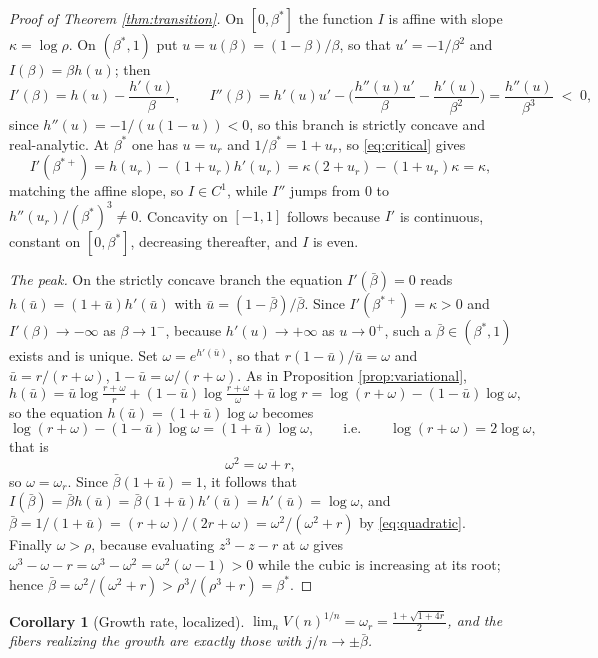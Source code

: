 \documentclass[11pt]{amsart}
\newtheorem{corollary}[theorem]{Corollary}
\theoremstyle{definition}
\theoremstyle{remark}
\begin{document}
\begin{proof}[Proof of Theorem \ref{thm:transition}]
On $[0,\beta^{*}]$ the function $I$ is affine with slope $\kappa=\log\rho$. On $(\beta^{*},1)$ put $u=u(\beta)=(1-\beta)/\beta$, so that $u'=-1/\beta^{2}$ and $I(\beta)=\beta h(u)$; then
\[
I'(\beta)=h(u)-\frac{h'(u)}{\beta},
\qquad
I''(\beta)=h'(u)u'-\Big(\frac{h''(u)u'}{\beta}-\frac{h'(u)}{\beta^{2}}\Big)
=\frac{h''(u)}{\beta^{3}}\;<\;0 ,
\]
since $h''(u)=-1/(u(1-u))<0$, so this branch is strictly concave and real-analytic. At $\beta^{*}$ one has $u=u_r$ and $1/\beta^{*}=1+u_r$, so \eqref{eq:critical} gives
\[
I'(\beta^{*+})=h(u_r)-(1+u_r)h'(u_r)=\kappa(2+u_r)-(1+u_r)\kappa=\kappa ,
\]
matching the affine slope, so $I\in C^{1}$, while $I''$ jumps from $0$ to $h''(u_r)/(\beta^{*})^{3}\neq0$. Concavity on $[-1,1]$ follows because $I'$ is continuous, constant on $[0,\beta^{*}]$, decreasing thereafter, and $I$ is even.

\emph{The peak.} On the strictly concave branch the equation $I'(\bar\beta)=0$ reads $h(\bar u)=(1+\bar u)h'(\bar u)$ with $\bar u=(1-\bar\beta)/\bar\beta$. Since $I'(\beta^{*+})=\kappa>0$ and $I'(\beta)\to-\infty$ as $\beta\to1^{-}$, because $h'(u)\to+\infty$ as $u\to0^{+}$, such a $\bar\beta\in(\beta^{*},1)$ exists and is unique. Set $\omega=e^{h'(\bar u)}$, so that $r(1-\bar u)/\bar u=\omega$ and $\bar u=r/(r+\omega)$, $1-\bar u=\omega/(r+\omega)$. As in Proposition \ref{prop:variational},
\[
h(\bar u)=\bar u\log\tfrac{r+\omega}{r}+(1-\bar u)\log\tfrac{r+\omega}{\omega}+\bar u\log r=\log(r+\omega)-(1-\bar u)\log\omega ,
\]
so the equation $h(\bar u)=(1+\bar u)\log\omega$ becomes
\[
\log(r+\omega)-(1-\bar u)\log\omega=(1+\bar u)\log\omega,
\qquad\text{i.e.}\qquad
\log(r+\omega)=2\log\omega,
\]
that is
\begin{equation}\label{eq:quadratic}
\omega^{2}=\omega+r,
\end{equation}
so $\omega=\omega_r$. Since $\bar\beta(1+\bar u)=1$, it follows that $I(\bar\beta)=\bar\beta h(\bar u)=\bar\beta(1+\bar u)h'(\bar u)=h'(\bar u)=\log\omega$, and $\bar\beta=1/(1+\bar u)=(r+\omega)/(2r+\omega)=\omega^{2}/(\omega^{2}+r)$ by \eqref{eq:quadratic}. Finally $\omega>\rho$, because evaluating $z^{3}-z-r$ at $\omega$ gives $\omega^{3}-\omega-r=\omega^{3}-\omega^{2}=\omega^{2}(\omega-1)>0$ while the cubic is increasing at its root; hence
$\bar\beta=\omega^{2}/(\omega^{2}+r)>\rho^{3}/(\rho^{3}+r)=\beta^{*}$.
\end{proof}

\begin{corollary}[Growth rate, localized]\label{cor:growth}
$\lim_n V(n)^{1/n}=\omega_r=\tfrac{1+\sqrt{1+4r}}2$, and the fibers realizing the growth are exactly those with $j/n\to\pm\bar\beta$.
\end{corollary}
\end{document}
